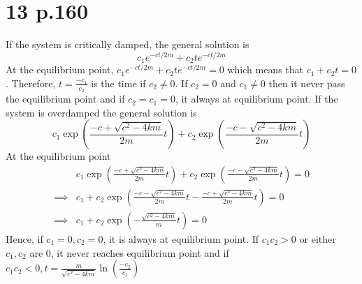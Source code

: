 \documentclass[11pt]{article}
\begin{document}
\section*{13 p.160}
If the system is critically damped, the general solution is 
\[
    c_1 e^{-ct/2m} + c_2 te^{-ct/2m}    
\]
At the equilibrium point, $c_1 e^{-ct/2m} + c_2 te^{-ct/2m} = 0$ which means that $c_1 + c_2t = 0$. 
Therefore, $t = \frac{-c_1}{c_2}$ is the time if $c_2 \ne 0$. 
If $c_2=0$ and $c_1 \ne 0$ then it never pass the equilibrium point 
and if $c_2 = c_1 = 0$,  it always at equilibrium point.
If the system is overdamped the general solution is 
\[
    c_1 \exp\left({\frac{-c + \sqrt{c^2-4km}}{2m}t} \right) + c_2 \exp\left({\frac{-c - \sqrt{c^2-4km}}{2m}t} \right)    
\]
At the equilibrium point 
\begin{equation*}
    \begin{aligned}
        &c_1 \exp\left(\frac{-c + \sqrt{c^2-4km}}{2m}t \right) + c_2 \exp\left(\frac{-c - \sqrt{c^2-4km}}{2m}t \right) = 0\\
        \implies &c_1 + c_2 \exp \left(\frac{-c - \sqrt{c^2-4km}}{2m}t - \frac{-c + \sqrt{c^2-4km}}{2m}t \right) = 0\\
        \implies &c_1 + c_2 \exp \left(-\frac{\sqrt{c^2-4km}}{m} t \right) = 0
    \end{aligned}
\end{equation*}
Hence, if $c_1 = 0, c_2=0$, it is always at equilibrium point. If $c_1 c_2 > 0$ or either $c_1, c_2$ are 0, it never reaches equilibrium point 
and if $c_1c_2<0, t = \frac{m}{\sqrt{c^2-4km}} \ln\left( \frac{-c_2}{c_1}\right)$
\newpage
\end{document}
